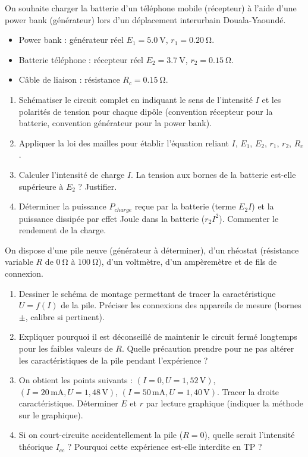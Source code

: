 \documentclass[11pt]{article}
\begin{document}
\begin{exercice}
On souhaite charger la batterie d'un téléphone mobile (récepteur) à l'aide d'une power bank (générateur) lors d'un déplacement interurbain Douala-Yaoundé.
\begin{itemize}
    \item Power bank : générateur réel $E_1 = \SI{5,0}{\volt}$, $r_1 = \SI{0,20}{\ohm}$.
    \item Batterie téléphone : récepteur réel $E_2 = \SI{3,7}{\volt}$, $r_2 = \SI{0,15}{\ohm}$.
    \item Câble de liaison : résistance $R_c = \SI{0,15}{\ohm}$.
\end{itemize}
\begin{enumerate}
    \item Schématiser le circuit complet en indiquant le sens de l'intensité $I$ et les polarités de tension pour chaque dipôle (convention récepteur pour la batterie, convention générateur pour la power bank).
    \item Appliquer la loi des mailles pour établir l'équation reliant $I$, $E_1$, $E_2$, $r_1$, $r_2$, $R_c$.
    \item Calculer l'intensité de charge $I$. La tension aux bornes de la batterie est-elle supérieure à $E_2$ ? Justifier.
    \item Déterminer la puissance $P_{charge}$ reçue par la batterie (terme $E_2 I$) et la puissance dissipée par effet Joule dans la batterie ($r_2 I^2$). Commenter le rendement de la charge.
\end{enumerate}
\end{exercice}

\begin{exercice}
On dispose d'une pile neuve (générateur à déterminer), d'un rhéostat (résistance variable $R$ de $\SI{0}{\ohm}$ à $\SI{100}{\ohm}$), d'un voltmètre, d'un ampèremètre et de fils de connexion.
\begin{enumerate}
    \item Dessiner le schéma de montage permettant de tracer la caractéristique $U = f(I)$ de la pile. Préciser les connexions des appareils de mesure (bornes $\pm$, calibre si pertinent).
    \item Expliquer pourquoi il est déconseillé de maintenir le circuit fermé longtemps pour les faibles valeurs de $R$. Quelle précaution prendre pour ne pas altérer les caractéristiques de la pile pendant l'expérience ?
    \item On obtient les points suivants : $(I=0, U=1,52\,\text{V})$, $(I=20\,\text{mA}, U=1,48\,\text{V})$, $(I=50\,\text{mA}, U=1,40\,\text{V})$. Tracer la droite caractéristique. Déterminer $E$ et $r$ par lecture graphique (indiquer la méthode sur le graphique).
    \item Si on court-circuite accidentellement la pile ($R=0$), quelle serait l'intensité théorique $I_{cc}$ ? Pourquoi cette expérience est-elle interdite en TP ?
\end{enumerate}
\end{exercice}
\end{document}
